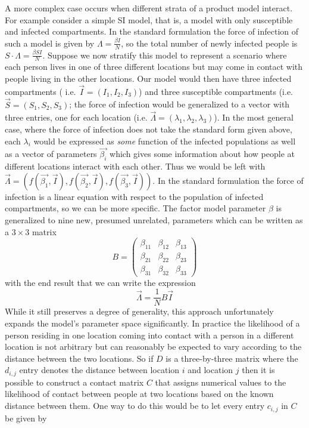 \documentclass[pdflatex,sn-basic]{sn-jnl}%
\theoremstyle{definition}
\begin{document}
A more complex case occurs when different strata of a product model interact. For example consider a simple SI model, that is, a model with only susceptible and infected compartments. In the standard formulation the force of infection of such a model is given by $\Lambda = \frac{\beta I}{N}$, so the total number of newly infected people is $S\cdot \Lambda = \frac{\beta S I}{N}$. Suppose we now stratify this model to represent a scenario where each person lives in one of three different locations but may come in contact with people living in the other locations. Our model would then have three infected compartments ( i.e. $\vec{I} = (I_1, I_2, I_3)$) and three susceptible compartments (i.e. $\vec{S} = (S_1, S_2, S_3)$; the force of infection would be generalized to a vector with three entries, one for each location (i.e. $\vec{\Lambda} = (\lambda_1, \lambda_2, \lambda_3)$). 
In the most general case, where the force of infection does not take the standard form given above, each $\lambda_i$ would be expressed as \emph{some} function of the infected populations as well as a vector of parameters $\vec{\beta_i}$ which gives some information about how people at different locations interact with each other. Thus we would be left with $\vec{\Lambda} = (f(\vec{\beta_1}, \vec{I}), f(\vec{\beta_2}, \vec{I}), f(\vec{\beta_3}, \vec{I}))$. 
In the standard formulation the force of infection is a linear equation with respect to the population of infected compartments, so we can be more specific. The factor model parameter $\beta$ is generalized to nine new, presumed unrelated, parameters which can be written as a $3 \times 3$ matrix
\[
    B = \begin{pmatrix}
        \beta_{11} & \beta_{12} & \beta_{13} \\
        \beta_{21} & \beta_{22} & \beta_{23} \\
        \beta_{31} & \beta_{32} & \beta_{33}
    \end{pmatrix}
\]
with the end result that we can write the expression
\[
    \vec{\Lambda} = \frac{1}{N} B \vec{I}
\]
While it still preserves a degree of generality, this approach unfortunately expands the model's parameter space significantly. In practice the likelihood of a person residing in one location coming into contact with a person in a different location is not arbitrary but can reasonably be expected to vary according to the distance between the two locations. So if $D$ is a three-by-three matrix where the $d_{i,j}$ entry denotes the distance between location $i$ and location $j$ then it is possible to construct a contact matrix $C$ that assigns numerical values to the likelihood of contact between people at two locations based on the known distance between them. One way to do this would be to let every entry $c_{i,j}$ in $C$ be given by
\end{document}
